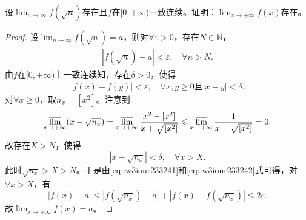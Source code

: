 \documentclass[../../main.tex]{subfiles}%
\begin{document}
\begin{example}
设\( \lim_{n \to \infty} f(\sqrt{n}) \)存在且\( f \)在\( [0, +\infty) \)一致连续。证明：\( \lim_{x \to +\infty} f(x) \)存在。
\end{example}
\begin{proof}
设\( \lim_{n \to \infty} f(\sqrt{n}) = a \)，则对\( \forall \varepsilon > 0 \)，存在\( N \in \mathbb{N} \)，
\begin{align}
|f(\sqrt{n}) - a| < \varepsilon, \quad \forall n > N. \label{eq::w3iour233241}
\end{align}
由\( f \)在\( [0, +\infty) \)上一致连续知，存在\( \delta > 0 \)，使得
\begin{align}
|f(x) - f(y)| < \varepsilon, \quad \forall x, y \geqslant 0 \text{且} |x - y| < \delta. \label{eq::w3iour233242}
\end{align}
对\( \forall x \geqslant 0 \)，取\( n_x = [x^2] \)。注意到
\[
\varlimsup_{x \to +\infty} (x - \sqrt{n_x}) = \varlimsup_{x \to +\infty} \frac{x^2 - [x^2]}{x + \sqrt{[x^2]}} \leqslant \varlimsup_{x \to +\infty} \frac{1}{x + \sqrt{[x^2]}} = 0.
\]
故存在\( X > N \)，使得
\[
|x - \sqrt{n_x}| < \delta, \quad \forall x > X.
\]
此时\( \sqrt{n_x} > X > N \)。于是由\eqref{eq::w3iour233241}和\eqref{eq::w3iour233242}式可得，对\( \forall x > X \)，有
\[
|f(x) - a| \leqslant |f(\sqrt{n_x}) - a| + |f(x) - f(\sqrt{n_x})| \leqslant 2\varepsilon.
\]
故\( \lim_{x \to +\infty} f(x) = a \)。
\end{proof}
\end{document}
